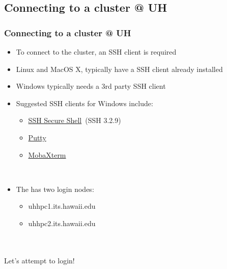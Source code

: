 \subsection{Connecting to a cluster @ UH}
\begin{frame}
	\frametitle{Connecting to a cluster @ UH}
	\begin{description}[\setlength{\leftmargini}{0pt}]
	\item[] \begin{itemize}
		\item To connect to the cluster, an SSH client is required
		\item Linux and MacOS X, typically have a SSH client already installed
		\item Windows typically needs a 3rd party SSH client
		\item Suggested SSH clients for Windows include:
		\begin{itemize}
			\item \href{http://www.hawaii.edu/askus/685}{SSH Secure Shell}~(SSH 3.2.9)
			\item \href{http://www.chiark.greenend.org.uk/~sgtatham/putty/download.html}{Putty}
                        \item \href{http://mobaxterm.mobatek.net/}{MobaXterm}
		\end{itemize}
	\end{itemize}
	\item[] ~\\
	\item[] \begin{itemize}
		\item The {\craycs} has two login nodes:
		\begin{itemize}
			\item uhhpc1.its.hawaii.edu
			\item uhhpc2.its.hawaii.edu
		\end{itemize}
	\end{itemize}
	\end{description}
        ~\\~\\
	{\large Let's attempt to login!}
\end{frame}



